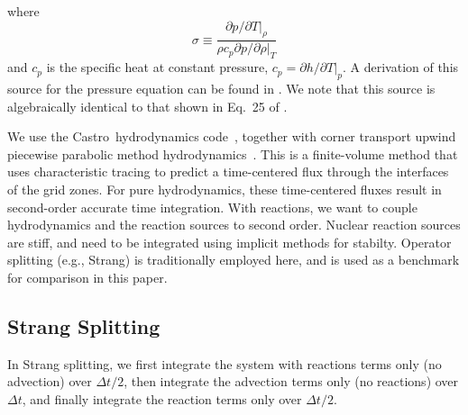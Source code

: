 \documentclass[times,modern]{aastex63}
\newcommand{\castro}{{\sf Castro}}
\begin{document}
where
\begin{equation}
\sigma \equiv \frac{\partial p/\partial T |_\rho}{\rho c_p \partial p/\partial \rho |_T}
\end{equation}
and $c_p$ is the specific heat at constant pressure, $c_p = \partial
h/\partial T |_p$.  A derivation of this source for the pressure
equation can be found in \cite{ABNZ:III}.  We note that this source is
algebraically identical to that shown in Eq.~25 of \cite{castro}.



We use the \castro\ hydrodynamics code~\cite{castro}, together with
corner transport upwind piecewise parabolic method
hydrodynamics~\citep{millercolella:2002}.  This is a finite-volume
method that uses characteristic tracing to predict a time-centered
flux through the interfaces of the grid zones.  For pure
hydrodynamics, these time-centered fluxes result in second-order
accurate time integration.  With reactions, we want to couple
hydrodynamics and the reaction sources to second order.  Nuclear
reaction sources are stiff, and need to be integrated using implicit
methods for stabilty.  Operator splitting (e.g., Strang) is traditionally employed
here, and is used as a benchmark for comparison in this paper.



\subsection{Strang Splitting}

In Strang splitting, we first integrate the system with reactions terms only (no advection)
over $\Delta t/2$, then integrate the advection terms only (no reactions) over $\Delta t$,
and finally integrate the reaction terms only over $\Delta t/2$.
\end{document}
